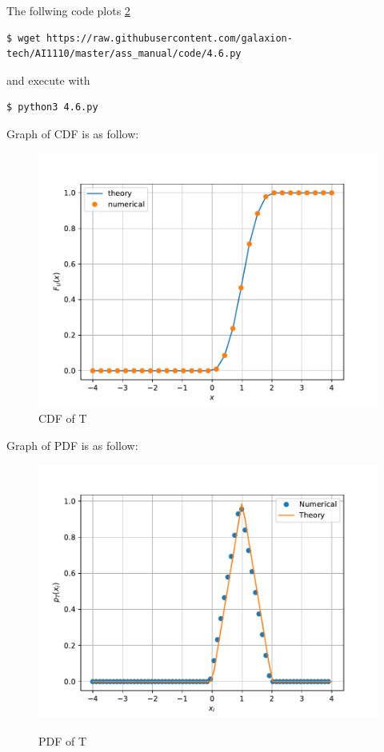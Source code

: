 \documentclass[journal,12pt,twocolumn]{IEEEtran}
\renewcommand\thesection{\arabic{section}}
\begin{document}
\begin{enumerate}[label=\thesection.\arabic*.,ref=\thesection.\theenumi]
    The follwing code plots \ref{fig 4.6}
    \begin{lstlisting}
$ wget https://raw.githubusercontent.com/galaxion-tech/AI1110/master/ass_manual/code/4.6.py 
    \end{lstlisting}
    and execute with
    \begin{lstlisting}
$ python3 4.6.py
    \end{lstlisting}
    Graph of CDF is as follow:
    \begin{figure}[H]
        \includegraphics[scale=0.6]{./figs/4.5}
        \caption{CDF of T}
        \label{fig 4.5}
    \end{figure}
    Graph of PDF is as follow:
    \begin{figure}[H]
        \includegraphics[scale=0.6]{./figs/4.6}
        \label{fig 4.6}
        \caption{PDF of T}
    \end{figure}
\end{enumerate}
\end{document}
